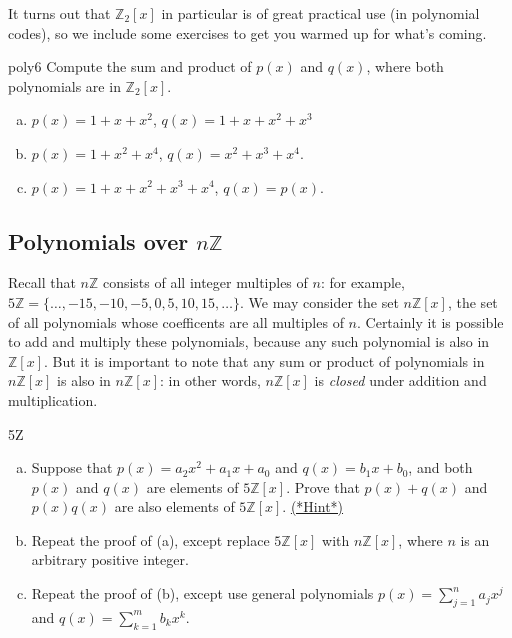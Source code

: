 It turns out that $\mathbb{Z}_2[x]$ in particular is of great practical use (in polynomial codes), so we include some exercises to get you warmed up for what's coming.

\begin{exercise}{poly6}
Compute the sum and product of $p(x)$ and $q(x)$, where both polynomials are in $\mathbb{Z}_2[x]$.
\begin{enumerate}[(a)]
\item
$p(x)=  1+ x +x^2$, $q(x)= 1+x+x^2+x^3$
\item
$p(x)= 1 + x^2+x^4$, $q(x)=x^2+x^3+x^4 $.
\item
$p(x)= 1 +x+x^2+x^3+x^4 $, $q(x)=p(x)$.
\end{enumerate}
\end{exercise}

\subsection*{Polynomials over $n\mathbb{Z}$}
Recall that $n\mathbb{Z}$ consists of all integer multiples of $n$: for example, $5\mathbb{Z} = \{\ldots, -15,-10,-5,0,5,10,15,\ldots\}$.  
We may consider the set $n\mathbb{Z}[x]$, the set of all polynomials whose coefficents are all multiples of $n$.  Certainly it is possible to add and multiply 
these polynomials, because any such polynomial is also in $\mathbb{Z}[x]$.  But it is important to note that any sum or product of polynomials in 
$n\mathbb{Z}[x]$ is also in $n\mathbb{Z}[x]$: in other words, $n\mathbb{Z}[x]$ is \emph{closed} under addition and multiplication.


\begin{exercise}{5Z}
\begin{enumerate}[(a)]
\item
Suppose that $p(x) = a_2 x^2 + a_1 x + a_0$ and $q(x) = b_1 x + b_0$, and both $p(x)$ and $q(x)$ are elements of $5\mathbb{Z}[x]$. Prove that 
$p(x) + q(x)$ and $p(x)  q(x)$ are also elements of $5\mathbb{Z}[x]$. \hyperref[sec:polyrings:hints]{(*Hint*)} 

\item
Repeat the proof of (a), except replace $5\mathbb{Z}[x]$ with $n\mathbb{Z}[x]$, where $n$ is an arbitrary positive integer.

\item
Repeat the proof of (b), except use general polynomials $p(x) = \sum_{j=1}^n a_jx^j$ and $q(x) = \sum_{k=1}^m b_k x^k$.
\end{enumerate}
\end{exercise}

